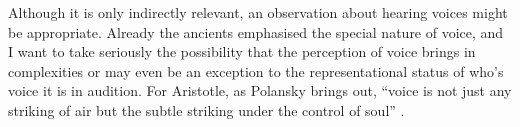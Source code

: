 \documentclass[sloppy, journal, git, bytitle, dodraft]{humapap}
\begin{document}
% 
% 

\sect Although it is only indirectly relevant, an observation about hearing voices might be appropriate. Already the ancients emphasised the special nature of voice, and I want to take seriously the possibility that the perception of voice brings in complexities or may even be an exception to the representational status of who's voice it is in audition. For Aristotle, as Polansky brings out, ``voice is not just any striking of air but the subtle striking under the control of soul'' \autocite[p. 300]{polansky2007aa}. 


\end{document}
